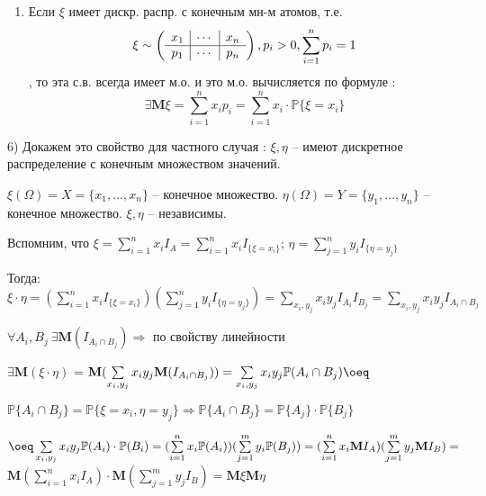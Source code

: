 \begin{proofs}
\begin{enumerate}
    \item Если $\xi$ имеет дискр. распр. с конечным мн-м атомов, т.е.
    \[ \xi \sim \left( \begin{array}{ccc}
      x_1 & \multicolumn{1}{|c}{\cdots} & \multicolumn{1}{|c}{x_n}\\ \hline
      p_1 & \multicolumn{1}{|c}{\cdots} & \multicolumn{1}{|c}{p_n}\\
    \end{array} \right), p_i > 0, \sum\limits_{i=1}^{n}p_i = 1 \], то эта с.в. всегда имеет м.о.
    и это м.о. вычисляется по формуле : $$\exists\mathbf{M}\xi = \sum\limits_{i=1}^{n}x_i p_i = \sum\limits_{i=1}^{n}x_i \cdot \mathbb{P}\{\xi = x_i\}$$
  \end{enumerate}
  \begin{dokvo}
    6) Докажем это свойство для частного случая : $\xi,\eta$ -- имеют дискретное распределение с конечным множеством значений.

    $\xi(\Omega) = X = \{x_1, \ldots, x_n\}$ -- конечное множество.
    $\eta(\Omega) = Y = \{y_1, \ldots, y_n\}$ -- конечное множество. $\xi,\eta$ -- независимы.

    Вспомним, что $\xi = \sum\limits_{i=1}^{n}x_i I_A = \sum\limits_{i=1}^{n}x_i I_{\{\xi = x_i\}}$; $\eta = \sum\limits_{j=1}^{n}y_i I_{\{\eta = y_j\}}$

    Тогда: $\xi \cdot \eta = (\sum\limits_{i=1}^{n}x_i I_{\{\xi = x_i\}})(\sum\limits_{j=1}^{n}y_i I_{\{\eta = y_j\}}) = \sum\limits_{x_i, y_j}x_i y_j I_{A_i} I_{B_j} = \sum\limits_{x_i, y_j}x_i y_j I_{A_i \cap B_j}$

    $\forall A_i , B_j\ \exists\mathbf{M}(I_{A_i \cap B_j}) \Rightarrow$ по свойству линейности

    $\exists\mathbf{M}(\xi \cdot \eta)$ = $\mathbf{M}(\sum\limits_{x_i, y_j}x_i y_j \mathbf{M}(I_{A_i \cap B_j})) = \sum\limits_{x_i, y_j}x_i y_j \mathbb{P}(A_i \cap B_j) \oeq$

    $\mathbb{P}\{A_i \cap B_j\} = \mathbb{P}\{\xi = x_i, \eta = y_j\} \Rightarrow \mathbb{P}\{A_i \cap B_j\} = \mathbb{P}\{A_j\} \cdot \mathbb{P}\{B_j\}$

    $\oeq \sum\limits_{x_i, y_j}x_i y_j \mathbb{P}(A_i) \cdot \mathbb{P}(B_i) = (\sum\limits_{i=1}^{n}x_i \mathbb{P}(A_i))(\sum\limits_{j=1}^{m}y_i \mathbb{P}(B_j)) = (\sum\limits_{i=1}^{n}x_i \mathbf{M} I_A)(\sum\limits_{j=1}^{m}y_j \mathbf{M} I_B) =$
    $\mathbf{M}(\sum\limits_{i=1}^{n}x_i I_A) \cdot \mathbf{M}(\sum\limits_{j=1}^{m}y_j I_B) = \mathbf{M}\xi\mathbf{M}\eta$
  \end{dokvo}
\end{proofs}

